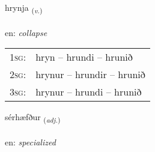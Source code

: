 \documentclass[frontgrid, backgrid]{flacards}\usepackage[]{graphicx}\usepackage[]{xcolor}
\begin{document}
\renewcommand{\flhead}{\vskip5pt \fboxsep=0pt {\small\bfseries\footnotesize Sagnorð | Verb}}
\renewcommand{\fcfoot}{\vskip5pt \fboxsep=0pt \hspace{2pt}{\small\bfseries\footnotesize 3K}}

\renewcommand{\blhead}{\vskip5pt {\small\bfseries\footnotesize Sagnorð | Verb }}
\renewcommand{\bcfoot}{\vskip5pt \hspace{2pt}{\small\bfseries\footnotesize 3K}}


{hrynja \small{\textsubscript{(\textit{v.})}} \\[1ex] %
\textphonetic{[r̥ɪnja]} \\
en: \emph{collapse} \\  [2ex]
\renewcommand*{\arraystretch}{0.8}
\begin{tabular}{p{1cm}l}
\textsc{1sg}: & hryn -- hrundi -- hrunið \\ 
\textsc{2sg}: & hrynur -- hrundir -- hrunið \\ 
\textsc{3sg}: & hrynur -- hrundi -- hrunið \\ 
\end{tabular}
}

\renewcommand{\flhead}{\vskip5pt \fboxsep=0pt {\small\bfseries\footnotesize Lýsingarorð | Adjective}}
\renewcommand{\fcfoot}{\vskip5pt \fboxsep=0pt \hspace{2pt}{\small\bfseries\footnotesize 3K}}

\renewcommand{\blhead}{\vskip5pt {\small\bfseries\footnotesize Lýsingarorð | Adjective }}
\renewcommand{\bcfoot}{\vskip5pt \hspace{2pt}{\small\bfseries\footnotesize 3K}}


{sérhæfður \small{\textsubscript{(\textit{adj.})}} \\[1ex] %
\textphonetic{[sjɛːrhaivðʏr]} \\
en: \emph{specialized} \\  [2ex]
\renewcommand*{\arraystretch}{0.8}
}
\end{document}
